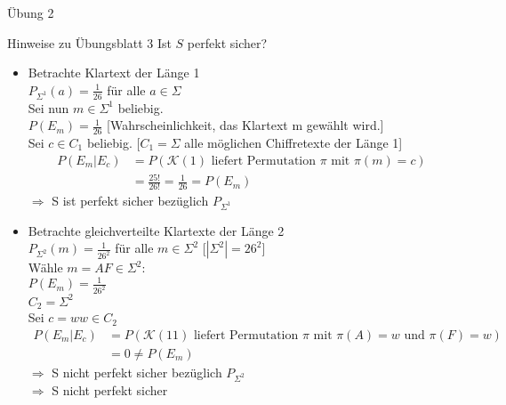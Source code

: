 \begin{section}{Übung 2}
\begin{subsection}{Hinweise zu Übungsblatt 3}
  Ist $S$ perfekt sicher? \\
  \begin{itemize}
   \item Betrachte Klartext der Länge 1 \\
   $P_{\Sigma^1}(a) = \frac{1}{26}$ für alle $a \in \Sigma$\\
   Sei nun $m \in \Sigma^1$ beliebig. \\
   $P(E_m) = \frac{1}{26}$ [Wahrscheinlichkeit, das Klartext m gewählt wird.] \\
   Sei $c \in C_1$ beliebig. [$C_1 = \Sigma$ alle möglichen Chiffretexte der Länge 1]
   \begin{align*}
      P(E_m|E_c) &= P(\mathcal{K}(1) \text{ liefert Permutation }\pi\text{ mit } \pi(m) = c)\\
      &= \frac{25!}{26!} = \frac{1}{26} = P(E_m)
   \end{align*}
   $\Rightarrow$ S ist perfekt sicher bezüglich $P_{\Sigma^1}$
   \item Betrachte gleichverteilte Klartexte der Länge 2 \\
   $P_{\Sigma^2}(m) = \frac{1}{26^2}$ für alle $m \in \Sigma^2$ [$|\Sigma^2| = 26^2$]\\
   Wähle $m=AF \in \Sigma^2$: \\
   $P(E_m) = \frac{1}{26^2}$ \\
   $C_2 = \Sigma^2$ \\
   Sei $c = ww \in C_2$
   \begin{align*}
    P(E_m|E_c) &= P(\mathcal{K}(11) \text{ liefert Permutation }\pi\text{ mit }\pi(A)=w\text{ und }\pi(F)=w)\\
    &= 0 \neq P(E_m) 
   \end{align*}
   $\Rightarrow$ S nicht perfekt sicher bezüglich $P_{\Sigma^2}$\\
   $\Rightarrow$ S nicht perfekt sicher
  \end{itemize}
 \end{subsection}
\end{section}
